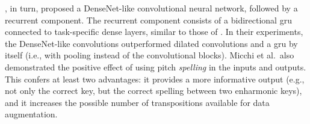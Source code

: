 \textcite{micchi2020not}, in turn, proposed a DenseNet-like
\parencite{huang2017densely} convolutional neural network,
followed by a recurrent component. The recurrent component
consists of a bidirectional \gls{gru}
\parencite{cho2014learning} connected to task-specific dense
layers, similar to those of \textcite{chen2018functional}.
In their experiments, the DenseNet-like convolutions
outperformed dilated convolutions and a \gls{gru} by itself
(i.e., with pooling instead of the convolutional blocks).
Micchi et al.~also demonstrated the positive effect of using
pitch \textit{spelling} in the inputs and outputs. This
confers at least two advantages: it provides a more
informative output (e.g., not only the correct key, but the
correct spelling between two enharmonic keys), and it
increases the possible number of transpositions available
for data augmentation.


